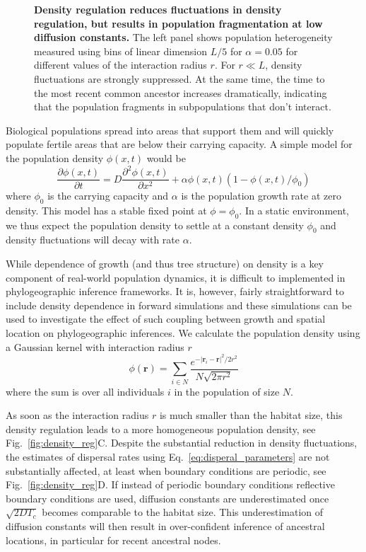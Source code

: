 \documentclass[aps,rmp, twocolumn]{revtex4}
\newcommand{\rvec}{\mathbf{r}}
\begin{document}
\begin{figure}
{    {\bf Density regulation reduces fluctuations in density regulation, but results in population fragmentation at low diffusion constants.} The left panel shows population heterogeneity measured using bins of linear dimension $L/5$ for $\alpha =0.05$ for different values of the interaction radius $r$. For $r\ll L$, density fluctuations are strongly suppressed. At the same time, the time to the most recent common ancestor increases dramatically, indicating that the population fragments in subpopulations that don't interact.}
\end{figure}

Biological populations spread into areas that support them and will quickly populate fertile areas that are below their carrying capacity.
A simple model for the population density $\phi(x,t)$ would be
\begin{equation}
    \label{eq:FKPP}
    \frac{\partial \phi(x,t)}{\partial t} = D\frac{\partial^2 \phi(x,t)}{\partial x^2} + \alpha \phi(x,t)(1-\phi(x,t)/\phi_0)
\end{equation}
where $\phi_0$ is the carrying capacity and $\alpha$ is the population growth rate at zero density.
This model has a stable fixed point at $\phi=\phi_0$.
In a static environment, we thus expect the population density to settle at a constant density $\phi_0$ and density fluctuations will decay with rate $\alpha$.

While dependence of growth (and thus tree structure) on density is a key component of real-world population dynamics, it is difficult to implemented in phylogeographic inference frameworks.
It is, however, fairly straightforward to include density dependence in forward simulations and these simulations can be used to investigate the effect of such coupling between growth and spatial location on phylogeographic inferences.
We calculate the population density using a Gaussian kernel with interaction radius $r$
\begin{equation}
    \phi(\rvec) = \sum_{i\in N} \frac{e^{-|\rvec_i - \rvec|^2/2r^2}}{N\sqrt{2\pi r^2}}
\end{equation}
where the sum is over all individuals $i$ in the population of size $N$.

As soon as the interaction radius $r$ is much smaller than the habitat size, this density regulation leads to a more homogeneous population density, see Fig.~\ref{fig:density_reg}C.
Despite the substantial reduction in density fluctuations, the estimates of dispersal rates using Eq.~\ref{eq:disperal_parameters} are not substantially affected, at least when boundary conditions are periodic, see Fig.~\ref{fig:density_reg}D.
If instead of periodic boundary conditions reflective boundary conditions are used, diffusion constants are underestimated once $\sqrt{2DT_c}$ becomes comparable to the habitat size.
This underestimation of diffusion constants will then result in over-confident inference of ancestral locations, in particular for recent ancestral nodes.
\end{document}
